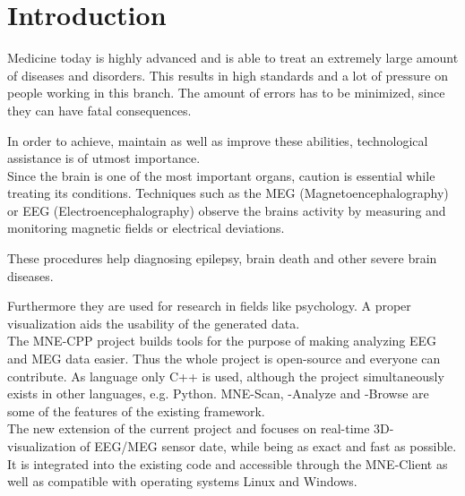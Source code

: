 
\section{Introduction}

	Medicine today is highly advanced and is able to treat an extremely large amount of diseases and disorders.
	This results in high standards and a lot of pressure on people working in this branch. The amount of errors has to be 		 	minimized, since they can have fatal consequences.

	In order to achieve, maintain as well as improve these abilities, technological assistance is of utmost importance.\\  

	Since the brain is one of the most important organs, caution is essential while treating its conditions. 
	Techniques such as the MEG (Magnetoencephalography) or EEG (Electroencephalography) observe the brains activity by 				measuring and monitoring magnetic fields or electrical deviations.

	These procedures help diagnosing epilepsy, brain death and other severe brain diseases.

	Furthermore they are used for research in fields like psychology.
	A proper visualization aids the usability of the generated data. \\

	The MNE-CPP  project builds tools for the purpose of making analyzing EEG and MEG data easier.
	Thus the whole project is open-source and everyone can contribute. As language only C++ is used, although the project 			simultaneously exists in other languages, e.g. Python. %
	MNE-Scan, -Analyze and -Browse are some of the features of the existing framework. \\

	The new extension of the current project and focuses on real-time 3D-visualization of EEG/MEG sensor date, while being as 		exact and fast as possible. It is integrated into the existing code and accessible through the MNE-Client as well as 			compatible with operating systems Linux and Windows.
  
